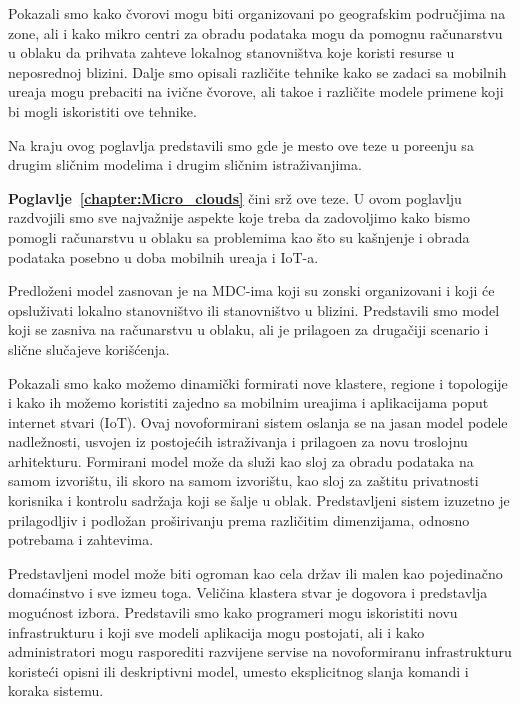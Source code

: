 Pokazali smo kako \v cvorovi mogu biti organizovani po geografskim podru\v cjima na zone, ali i kako mikro centri za obradu podataka mogu da pomognu ra\v cunarstvu u oblaku da prihvata zahteve lokalnog stanovni\v stva koje koristi resurse u neposrednoj blizini. Dalje smo opisali razli\v cite tehnike kako se zadaci sa mobilnih ure\dj aja mogu prebaciti na ivi\v cne \v cvorove, ali tako\dj e i razli\v cite modele primene koji bi mogli iskoristiti ove tehnike.

Na kraju ovog poglavlja predstavili smo gde je mesto ove teze u pore\dj enju sa drugim sli\v cnim modelima i drugim sli\v cnim istra\v zivanjima.

\textbf{Poglavlje~\ref{chapter:Micro_clouds}} \v cini sr\v z ove teze. U ovom poglavlju razdvojili smo sve najva\v znije aspekte koje treba da zadovoljimo kako bismo pomogli ra\v cunarstvu u oblaku sa problemima kao \v sto su ka\v snjenje i obrada podataka posebno u doba mobilnih ure\dj aja i IoT-a.

Predlo\v zeni model zasnovan je na MDC-ima koji su zonski organizovani i koji \'ce opslu\v zivati lokalno stanovni\v stvo ili stanovni\v stvo u blizini. Predstavili smo model koji se zasniva na ra\v cunarstvu u oblaku, ali je prilago\dj en za druga\v ciji scenario i sli\v cne slu\v cajeve kori\v s\'cenja.

Pokazali smo kako mo\v zemo dinami\v cki formirati nove klastere, regione i topologije i kako ih mo\v zemo koristiti zajedno sa mobilnim ure\dj ajima i aplikacijama poput internet stvari (IoT). Ovaj novoformirani sistem oslanja se na jasan model podele nadle\v znosti, usvojen iz postoje\'cih istra\v zivanja i prilago\dj en za novu troslojnu arhitekturu. Formirani model mo\v ze da slu\v zi kao sloj za obradu podataka na samom izvori\v stu, ili skoro na samom izvori\v stu, kao sloj za za\v stitu privatnosti korisnika i kontrolu sadr\v zaja koji se \v salje u oblak. Predstavljeni sistem izuzetno je prilagodljiv i podlo\v zan pro\v sirivanju prema razli\v citim dimenzijama, odnosno potrebama i zahtevima.

Predstavljeni model mo\v ze biti ogroman kao cela dr\v zav ili malen kao pojedina\v cno doma\'cinstvo i sve izme\dj u toga. Veli\v cina klastera stvar je dogovora i predstavlja mogu\'cnost izbora. Predstavili smo kako programeri mogu iskoristiti novu infrastrukturu i koji sve modeli aplikacija mogu postojati, ali i kako administratori mogu rasporediti razvijene servise na novoformiranu infrastrukturu koriste\'ci opisni ili deskriptivni model, umesto eksplicitnog slanja komandi i koraka sistemu.

